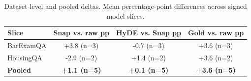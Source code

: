 \begin{table}[H]
\centering
\caption{Dataset-level and pooled deltas. Mean percentage-point differences across signed model slices.}
\label{tab:result_anatomy}
\footnotesize
\begin{tabular}{lccc}
\toprule
Slice & Snap vs. raw pp & HyDE vs. Snap pp & Gold vs. raw pp \\
\midrule
BarExamQA & +3.8 (n=3) & -0.7 (n=3) & +3.6 (n=3) \\
HousingQA & -2.9 (n=2) & +1.4 (n=2) & +3.6 (n=2) \\
\midrule
\textbf{Pooled} & \textbf{+1.1 (n=5)} & \textbf{+0.1 (n=5)} & \textbf{+3.6 (n=5)} \\
\bottomrule
\end{tabular}
\end{table}
